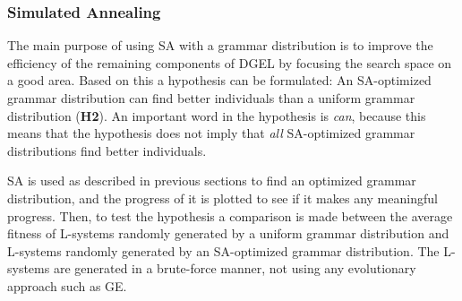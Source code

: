 \subsubsection{Simulated Annealing}
The main purpose of using \gls{SA} with a grammar distribution is to improve the efficiency of the remaining components of \gls{DGEL} by focusing the search space on a good area.
Based on this a hypothesis can be formulated: An \gls{SA}-optimized grammar distribution can find better individuals than a uniform grammar distribution (\textbf{H2}).
An important word in the hypothesis is \textit{can}, because this means that the hypothesis does not imply that \textit{all} \gls{SA}-optimized grammar distributions find better individuals.

\gls{SA} is used as described in previous sections to find an optimized grammar distribution, and the progress of it is plotted to see if it makes any meaningful progress.
Then, to test the hypothesis a comparison is made between the average fitness of \glspl{L-system} randomly generated by a uniform grammar distribution and \glspl{L-system} randomly generated by an \gls{SA}-optimized grammar distribution.
The \glspl{L-system} are generated in a brute-force manner, not using any evolutionary approach such as \gls{GE}.



